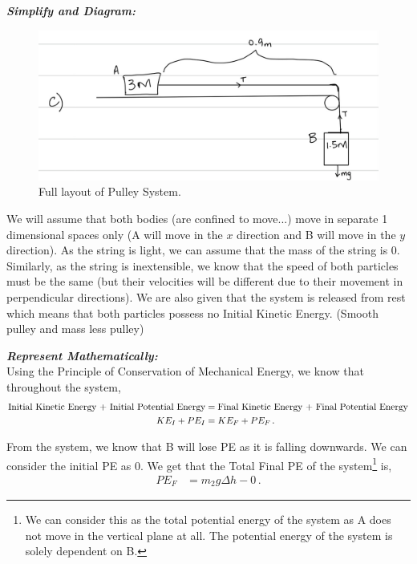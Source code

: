 \begin{subquestions}
\textbf{\textit{Simplify and Diagram:}} \\
\begin{figure}[H]
	\begin{center}
		\includegraphics[scale=0.25]{../2015/figures/2015q6-3}
		\caption{\label{2015:q6:fig:Diagram3} Full layout of Pulley System.}
	\end{center}
\end{figure}
We will assume that both bodies (are confined to move...) move in separate 1 dimensional spaces only (A will move in the $x$ direction and B will move in the $y$ direction). As the string is light, we can assume that the mass of the string is 0. Similarly, as the string is inextensible, we know that the speed of both particles must be the same (but their velocities will be different due to their movement in perpendicular directions). We are also given that the system is released from rest which means that both particles possess no Initial Kinetic Energy. (Smooth pulley and mass less pulley)
	
	
	
	
\textbf{\textit{Represent Mathematically:}} \\
Using the Principle of Conservation of Mechanical Energy, we know that throughout the system,
\begin{align}
	\text{Initial Kinetic Energy + Initial Potential Energy} & = \text{Final Kinetic Energy + Final Potential Energy} \nonumber \\
	KE_I + PE_I & = KE_F + PE_F \,. \label{2015:q6:energy1}
\end{align}

From the system, we know that B will lose PE as it is falling downwards. We can consider the initial PE as 0. We get that the Total Final PE of the system\footnote{We can consider this as the total potential energy of the system as A does not move in the vertical plane at all. The potential energy of the system is solely dependent on B.} is,
\begin{align}
	PE_F &  = m_2g\Delta h - 0 \,.
\end{align}


\end{subquestions}
